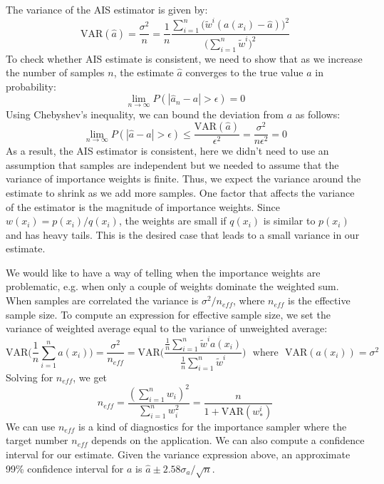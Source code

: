 The variance of the AIS estimator is given by:
\begin{equation}
    \mathrm{VAR}(\hat{a}) = \frac{\sigma^2}{n} = \frac{1}{n}\frac{\sum_{i=1}^{n}\bigg(\tilde{w}^{i}(a(x_i) - \hat{a}) \bigg)^{2}}{\bigg(\sum_{i=1}^{n}\tilde{w}^{i}\bigg)^{2}}
\end{equation}
To check whether AIS estimate is consistent, we need to show that as we increase the number of samples $n$, the estimate $\hat{a}$ converges to the true value $a$ in probability:
\begin{equation}
    \lim_{n\rightarrow \infty} P(|\hat{a}_n - a| > \epsilon) = 0
\end{equation}
Using Chebyshev's inequality, we can bound the deviation from $a$ as follows:
\begin{equation}
    \lim_{n\rightarrow \infty} P(|\hat{a} - a| > \epsilon) \leq \frac{\mathrm{VAR}(\hat{a})}{\epsilon^2} = \frac{\sigma^2}{n \epsilon^2} = 0
\end{equation}
As a result, the AIS estimator is consistent, here we didn't need to use an assumption that samples are independent but we needed to assume that the variance of importance weights is finite. Thus, we expect the variance around the estimate to shrink as we add more samples. One factor that affects the variance of the estimator is the magnitude of importance weights. Since $w(x_i) = p(x_i)/q(x_i)$, the weights are small if $q(x_i)$ is similar to $p(x_i)$ and has heavy tails. This is the desired case that leads to a small variance in our estimate. 

We would like to have a way of telling when the importance weights are problematic, e.g. when only a couple of weights dominate the weighted sum. When samples are correlated the variance is $\sigma^2 / n_{eff}$, where $n_{eff}$ is the effective sample size. To compute an expression for effective sample size, we set the variance of weighted average equal to the variance of unweighted average:
\begin{equation}
    \mathrm{VAR}\bigg(\frac{1}{n}\sum_{i=1}^{n}a(x_i)\bigg) = \frac{\sigma^2}{n_{eff}} = \mathrm{VAR}\bigg(\frac{\frac{1}{n}\sum_{i=1}^{n}\tilde{w}^ia(x_i)}{\frac{1}{n}\sum_{i=1}^{n}\tilde{w}^{i}}\bigg)~~~\mathrm{where}~~~\mathrm{VAR}(a(x_i)) = \sigma^2
\end{equation}
Solving for $n_{eff}$, we get
\begin{equation}
    n_{eff} = \frac{(\sum_{i=1}^{n}w_i)^2}{\sum_{i=1}^{n}w_{i}^{2}} = \frac{n}{1 + \mathrm{VAR}(w_{\ast}^{i})} 
\end{equation}
We can use $n_{eff}$ is a kind of diagnostics for the importance sampler where the target number $n_{eff}$ depends on the application. We can also compute a confidence interval for our estimate. Given the variance expression above, an approximate 99\% confidence interval for $a$ is $\hat{a} \pm 2.58 \sigma_a / \sqrt{n}$.\\

